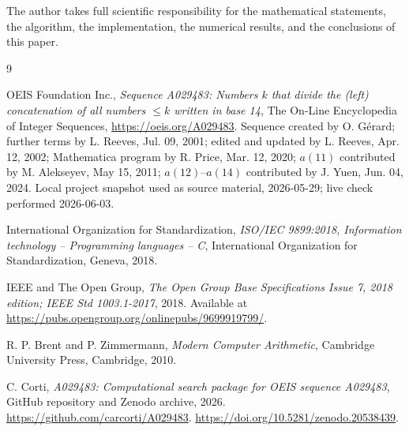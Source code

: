 \documentclass[11pt]{article}
\theoremstyle{definition}
\theoremstyle{remark}
\begin{document}
The author takes full scientific responsibility for the mathematical
statements, the algorithm, the implementation, the numerical results, and the
conclusions of this paper.

\begin{thebibliography}{9}
\sloppy
\raggedright

OEIS Foundation Inc.,
\emph{Sequence A029483: Numbers \(k\) that divide the (left)
concatenation of all numbers \(\le k\) written in base 14},
The On-Line Encyclopedia of Integer Sequences,
\url{https://oeis.org/A029483}.
Sequence created by O. G\'erard; further terms by L. Reeves, Jul. 09, 2001;
edited and updated by L. Reeves, Apr. 12, 2002; Mathematica program by
R. Price, Mar. 12, 2020; \(a(11)\) contributed by M. Alekseyev, May 15, 2011;
\(a(12)\)--\(a(14)\) contributed by J. Yuen, Jun. 04, 2024.  Local project
snapshot used as source material, 2026-05-29; live check performed
2026-06-03.

International Organization for Standardization,
\emph{ISO/IEC 9899:2018, Information technology -- Programming languages -- C},
International Organization for Standardization, Geneva, 2018.

IEEE and The Open Group,
\emph{The Open Group Base Specifications Issue 7, 2018 edition; IEEE Std
1003.1-2017},
2018.  Available at \url{https://pubs.opengroup.org/onlinepubs/9699919799/}.

R. P. Brent and P. Zimmermann,
\emph{Modern Computer Arithmetic},
Cambridge University Press, Cambridge, 2010.

C. Corti,
\emph{A029483: Computational search package for OEIS sequence A029483},
GitHub repository and Zenodo archive, 2026.
\url{https://github.com/carcorti/A029483}.
\url{https://doi.org/10.5281/zenodo.20538439}.

\end{thebibliography}
\end{document}
